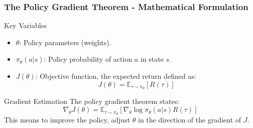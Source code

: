 \documentclass[aspectratio=169]{beamer}
\begin{document}
\begin{frame}[fragile]
    \frametitle{The Policy Gradient Theorem - Mathematical Formulation}
    \begin{block}{Key Variables}
        \begin{itemize}
            \item \( \theta \): Policy parameters (weights).
            \item \( \pi_\theta(a|s) \): Policy probability of action \( a \) in state \( s \).
            \item \( J(\theta) \): Objective function, the expected return defined as:
            \begin{equation}
                J(\theta) = \mathbb{E}_{\tau \sim \pi_\theta} \left[ R(\tau) \right]
            \end{equation}
        \end{itemize}
    \end{block}
    
    \begin{block}{Gradient Estimation}
        The policy gradient theorem states:
        \begin{equation}
            \nabla_\theta J(\theta) = \mathbb{E}_{\tau \sim \pi_\theta} \left[ \nabla_\theta \log \pi_\theta(a|s) R(\tau) \right]
        \end{equation}
        This means to improve the policy, adjust \( \theta \) in the direction of the gradient of \( J \).
    \end{block}
\end{frame}
\end{document}
